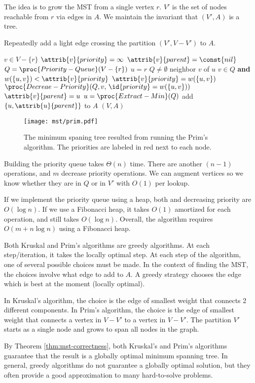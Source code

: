 The idea is to grow the MST from a single vertex $r$. $V'$ is the set of nodes reachable from $r$ via edges in $A$. We maintain the invariant that $(V',A)$ is a tree.

Repeatedly add a light edge crossing the partition $(V',V-V')$ to $A$.

\begin{codebox}
    \li \For $v \in V - \{r\}$ \Do
        \li $\attrib{v}{priority} = \infty$
        \li $\attrib{v}{parent} = \const{nil}$ \End
    \li $Q = \proc{Priority-Queue}(V-\{r\})$
    \li $u = r$ 
    \li \While $Q \neq \emptyset$ \Do
        \li \For neighbor $v$ of $u$ \Do
            \li \If $v \in Q$ \textbf{and} $w(\{u,v\}) < \attrib{v}{priority}$ \Then
                \li $\attrib{v}{priority} = w(\{u,v\})$
                \li $\proc{Decreae-Priority}(Q,v,\, \id{priority}=w(\{u,v\}))$ 
                \li $\attrib{v}{parent} = u$ \End
            \End
        \li $u = \proc{Extract-Min}(Q)$
        \li add $\{u,\attrib{u}{parent}\}$ to $A$
        \End
    \li \Return $(V,A)$ 
\end{codebox}

\begin{figure}
    \centering
    \texttt{[image: mst/prim.pdf]}
    \caption{The minimum spaning tree resulted from running the Prim's algorithm. The priorities are labeled in red next to each node.}
\end{figure}

Building the priority queue takes $\Theta(n)$ time. There are another $(n-1)$  operations, and $m$ decrease priority operations. We can augment vertices so we know whether they are in $Q$ or in $V'$ with $O(1)$ per lookup.

If we implement the priority queue using a heap, both  and decreasing priority are $O(\log n)$. If we use a Fibonacci heap, it takes $O(1)$ amortized for each  operation, and  still takes $O(\log n)$. Overall, the algorithm requires $O(m + n \log n)$  using a Fibonacci heap.

Both Kruskal and Prim's algorithms are greedy algorithms. At each step/iteration, it takes the locally optimal step. At each step of the algorithm, one of several possible choices must be made. In the context of finding the MST, the choices involve what edge to add to $A$. A greedy strategy chooses the edge which is best at the moment (locally optimal).

In Kruskal's algorithm, the choice is the edge of smallest weight that connects 2 different components. In Prim's algorithm, the choice is the edge of smallest weight that connects a vertex in $V-V'$ to a vertex in $V-V'$. The partition $V'$ starts as a single node and grows to span all nodes in the graph.

By Theorem \ref{thm:mst-correctness}, both Kruskal's and Prim's algorithms guarantee that the result is a globally optimal minimum spanning tree. In general, greedy algorithms do not guarantee a globally optimal solution, but they often provide a good approximation to many hard-to-solve problems.